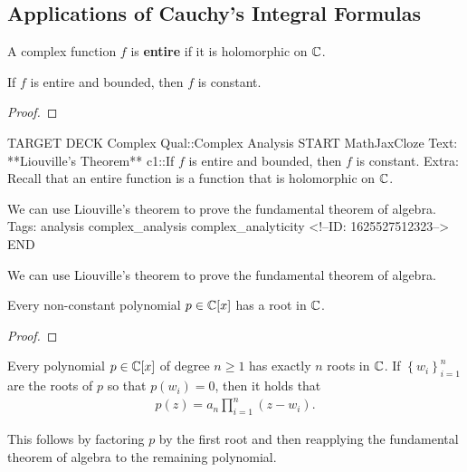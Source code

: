 \documentclass{memoir}
\begin{document}


\subsection{Applications of Cauchy's Integral Formulas}
\label{sub:applications_of_cauchy_s_integral_formulas}

\begin{defn}[Entire]
	A complex function \(f\) is \textbf{entire} if it is holomorphic on \(\mathbb{C}\).
\end{defn}

\begin{cor}
	If \(f\) is entire and bounded, then \(f\) is constant.
\end{cor}
\begin{proof}
	
\end{proof}

\begin{anki}
TARGET DECK
Complex Qual::Complex Analysis
START
MathJaxCloze
Text: **Liouville's Theorem**
{{c1::If \(f\) is entire and bounded, then \(f\) is constant.}} 
Extra: Recall that an entire function is a function that is holomorphic on \(\mathbb{C}\).

We can use Liouville's theorem to prove the fundamental theorem of algebra.
Tags: analysis complex_analysis complex_analyticity
<!--ID: 1625527512323-->
END
\end{anki}


We can use Liouville's theorem to prove the fundamental theorem of algebra.

\begin{cor}
	Every non-constant polynomial \(p \in \mathbb{C}[x]\) has a root in \(\mathbb{C}\).
\end{cor}
\begin{proof}
	
\end{proof}

\begin{cor}
	Every polynomial \(p \in \mathbb{C}[x]\) of degree \(n\geq 1\) has exactly \(n\) roots in \(\mathbb{C}\). If \(\left\{ w_i \right\}_{i=1}^{n}\) are the roots of \(p\) so that \(p(w_i) = 0\), then it holds that
	\begin{align*}
		p(z) = a_n \prod_{i=1}^{n} (z-w_i).
	\end{align*}
\end{cor}
This follows by factoring \(p\) by the first root and then reapplying the fundamental theorem of algebra to the remaining polynomial.
\end{document}
